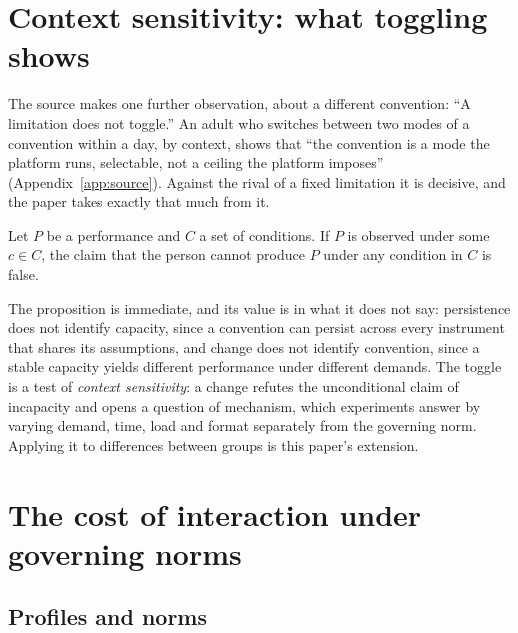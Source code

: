 \section{Context sensitivity: what toggling shows}
\label{sec:toggle}

The source makes one further observation, about a different convention: ``A limitation does not toggle.'' An adult who switches between two modes of a convention within a day, by context, shows that ``the convention is a mode the platform runs, selectable, not a ceiling the platform imposes'' (Appendix~\ref{app:source}). Against the rival of a fixed limitation it is decisive, and the paper takes exactly that much from it.

\begin{proposition}
\label{prop:toggle}
Let $P$ be a performance and $C$ a set of conditions. If $P$ is observed under some $c \in C$, the claim that the person cannot produce $P$ under any condition in $C$ is false.
\end{proposition}
\noindent The proposition is immediate, and its value is in what it does not say: persistence does not identify capacity, since a convention can persist across every instrument that shares its assumptions, and change does not identify convention, since a stable capacity yields different performance under different demands. The toggle is a test of \emph{context sensitivity}: a change refutes the unconditional claim of incapacity and opens a question of mechanism, which experiments answer by varying demand, time, load and format separately from the governing norm. Applying it to differences between groups is this paper's extension.

\section{The cost of interaction under governing norms}
\label{sec:model}

\subsection{Profiles and norms}

